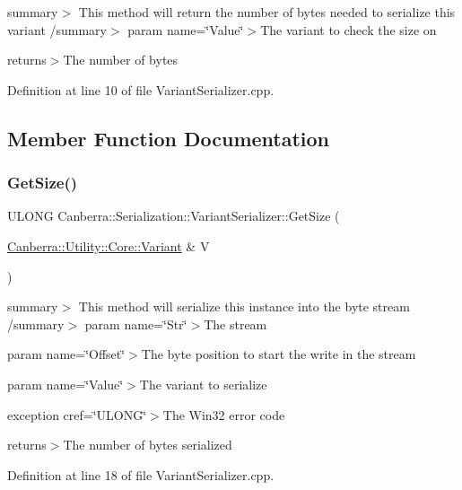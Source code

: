 summary$>$ This method will return the number of bytes needed to serialize this variant /summary$>$ param name=\char`\"{}\+Value\char`\"{}$>$The variant to check the size on

returns$>$The number of bytes

Definition at line 10 of file Variant\+Serializer.\+cpp.



\subsection{Member Function Documentation}
\mbox{\label{class_canberra_1_1_serialization_1_1_variant_serializer_aa1a72bee045b32010855cb3d1070bc3a_aa1a72bee045b32010855cb3d1070bc3a}} 
\subsubsection{\texorpdfstring{Get\+Size()}{GetSize()}}
{\footnotesize\ttfamily U\+L\+O\+NG Canberra\+::\+Serialization\+::\+Variant\+Serializer\+::\+Get\+Size (\begin{DoxyParamCaption}\item[{\hyperlink{class_canberra_1_1_utility_1_1_core_1_1_variant}{Canberra\+::\+Utility\+::\+Core\+::\+Variant} \&}]{V }\end{DoxyParamCaption})\hspace{0.3cm}{\ttfamily [static]}}

summary$>$ This method will serialize this instance into the byte stream /summary$>$ param name=\char`\"{}\+Str\char`\"{}$>$The stream

param name=\char`\"{}\+Offset\char`\"{}$>$The byte position to start the write in the stream

param name=\char`\"{}\+Value\char`\"{}$>$The variant to serialize

exception cref=\char`\"{}\+U\+L\+O\+N\+G\char`\"{}$>$The Win32 error code

returns$>$The number of bytes serialized

Definition at line 18 of file Variant\+Serializer.\+cpp.

